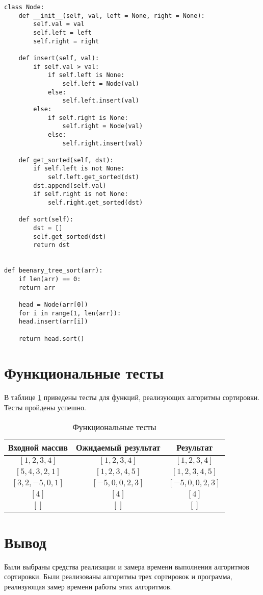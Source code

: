 \begin{lstlisting}[label=lst:beenary,caption=Алгоритм сортировки бинарным деревом]
class Node:
	def __init__(self, val, left = None, right = None):
		self.val = val
		self.left = left
		self.right = right
	
	def insert(self, val):
		if self.val > val:
			if self.left is None:
				self.left = Node(val)
			else:
				self.left.insert(val)
		else:
			if self.right is None:
				self.right = Node(val)
			else:
				self.right.insert(val)
	
	def get_sorted(self, dst):
		if self.left is not None:
			self.left.get_sorted(dst)
		dst.append(self.val)
		if self.right is not None:
			self.right.get_sorted(dst)
	
	def sort(self):
		dst = []
		self.get_sorted(dst)
		return dst


def beenary_tree_sort(arr):
	if len(arr) == 0:
	return arr

	head = Node(arr[0])
	for i in range(1, len(arr)):
	head.insert(arr[i])

	return head.sort()
\end{lstlisting}

\section{Функциональные тесты}

В таблице \ref{tbl:functional_test} приведены тесты для функций, реализующих алгоритмы сортировки. Тесты пройдены успешно.


\begin{table}[h]
	\begin{center}
		\captionsetup{justification=raggedright,singlelinecheck=off}
		\caption{\label{tbl:functional_test} Функциональные тесты}
		\begin{tabular}{|c|c|c|}
			\hline
			Входной массив & Ожидаемый результат & Результат \\ 
			\hline
			$[1,2,3,4]$ & $[1,2,3,4]$  & $[1,2,3,4]$\\
			$[5,4,3,2,1]$  & $[1,2,3,4,5]$ & $[1,2,3,4,5]$\\
			$[3,2,-5,0,1]$  & $[-5,0,0,2,3]$  & $[-5,0,0,2,3]$\\
			$[4]$  & $[4]$  & $[4]$\\
			$[]$  & $[]$  & $[]$\\
			\hline
		\end{tabular}
	\end{center}
\end{table}


\section*{Вывод}

Были выбраны средства реализации и замера времени выполнения алгоритмов сортировки. Были реализованы алгоритмы трех сортировок и программа, реализующая замер времени работы этих алгоритмов.
